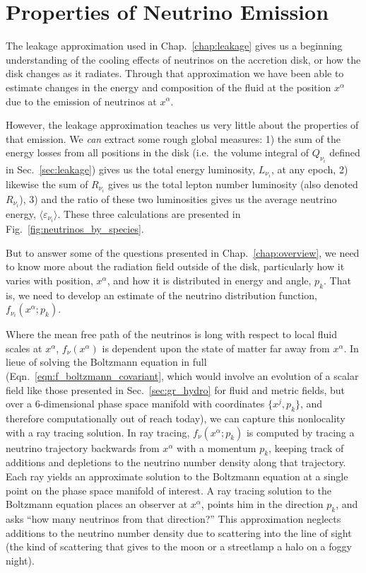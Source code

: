 \chapter{Properties of Neutrino Emission}
\label{chap:ray_tracing}

The leakage approximation used in Chap.~\ref{chap:leakage} gives us a beginning
understanding of the cooling effects of neutrinos on the accretion disk, or
how the disk changes as it radiates. Through that approximation we have been able
to estimate changes in the energy and composition of the fluid at the position
$x^\alpha$ due to the emission of neutrinos at $x^\alpha$.

However, the leakage approximation teaches us very little about the properties of
that emission. We \emph{can} extract some rough global measures:
1) the sum of the energy losses from all positions in the disk (i.e.\
the volume integral of $Q_{\nu_i}$ defined in Sec.~\ref{sec:leakage})
gives us the total energy luminosity, $L_{\nu_i}$, at any epoch,
2) likewise the sum of $R_{\nu_i}$ gives us the total lepton number luminosity
(also denoted $R_{\nu_i}$),
3) and the ratio of these two luminosities gives us the average neutrino energy,
$\langle \varepsilon_{\nu_i} \rangle$. These three calculations are presented in
Fig.~\ref{fig:neutrinos_by_species}.

But to answer some of the questions presented in Chap.~\ref{chap:overview}, we
need to know more about the radiation field outside of the disk, particularly
how it varies with position, $x^\alpha$, and how it is distributed in energy and
angle, $p_k$.
That is, we need to develop an estimate of the neutrino distribution function,
$f_{\nu_i}(x^\alpha;p_k)$.

Where the mean free path of the neutrinos is long with respect to local fluid
\todo{show this is the case}
scales at $x^\alpha$, $f_\nu(x^\alpha)$ is dependent upon the state of matter
far away from $x^\alpha$. In lieue of solving the Boltzmann equation in full
(Eqn.~\ref{eqn:f_boltzmann_covariant},
which would involve an evolution of a scalar field like those presented in
Sec.~\ref{sec:gr_hydro} for fluid and metric fields, but over a 6-dimensional
phase space manifold with coordinates $\{x^j,p_k\}$, and therefore
computationally out of reach today),
we can capture this nonlocality with a ray tracing solution.
In ray tracing, $f_\nu(x^\alpha;p_k)$ is computed by tracing a neutrino trajectory
backwards from $x^\alpha$ with a momentum $p_k$, keeping track of additions
and depletions to the neutrino number density along that trajectory.
Each ray yields an approximate solution to the Boltzmann equation at a
single point on the phase space manifold of interest. A ray
tracing solution to the Boltzmann equation places an observer at $x^\alpha$,
points him in the direction $p_k$, and asks ``how many neutrinos from that
direction?''
This approximation neglects additions to the neutrino number density due to
scattering into the line of sight (the kind of scattering that gives to the
moon or a streetlamp a halo on a foggy night).

